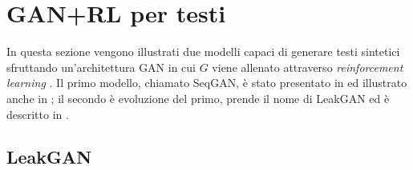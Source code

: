 

\section{GAN+RL per testi}
In questa sezione vengono illustrati due modelli capaci di generare testi sintetici sfruttando un'architettura GAN in cui $G$ viene allenato attraverso \emph{reinforcement learning} .
Il primo modello, chiamato SeqGAN, è stato presentato in \cite{SeqGAN} ed illustrato anche in \cite{GAN_for_text}; il secondo è evoluzione del primo, prende il nome di LeakGAN ed è descritto in \cite{LeakGAN}.

\subsection{LeakGAN}


